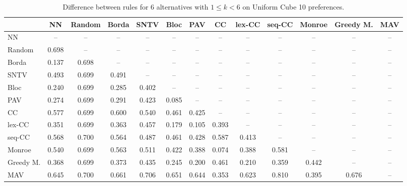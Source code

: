 
\begin{table*}[htbp]
\centering
\begin{tabular}{lcccccccccccc}
\toprule
 & NN & Random & Borda & SNTV & Bloc & PAV & CC & lex-CC & seq-CC & Monroe & Greedy M. & MAV \\
\midrule
NN & -- & -- & -- & -- & -- & -- & -- & -- & -- & -- & -- & -- \\
Random & \cellcolor{blue!69} 0.698 & -- & -- & -- & -- & -- & -- & -- & -- & -- & -- & -- \\
Borda & \cellcolor{blue!13} 0.137 & \cellcolor{blue!69} 0.698 & -- & -- & -- & -- & -- & -- & -- & -- & -- & -- \\
SNTV & \cellcolor{blue!49} 0.493 & \cellcolor{blue!69} 0.699 & \cellcolor{blue!49} 0.491 & -- & -- & -- & -- & -- & -- & -- & -- & -- \\
Bloc & \cellcolor{blue!24} 0.240 & \cellcolor{blue!69} 0.699 & \cellcolor{blue!28} 0.285 & \cellcolor{blue!40} 0.402 & -- & -- & -- & -- & -- & -- & -- & -- \\
PAV & \cellcolor{blue!27} 0.274 & \cellcolor{blue!69} 0.699 & \cellcolor{blue!29} 0.291 & \cellcolor{blue!42} 0.423 & \cellcolor{blue!8} 0.085 & -- & -- & -- & -- & -- & -- & -- \\
CC & \cellcolor{blue!57} 0.577 & \cellcolor{blue!69} 0.699 & \cellcolor{blue!60} 0.600 & \cellcolor{blue!54} 0.540 & \cellcolor{blue!46} 0.461 & \cellcolor{blue!42} 0.425 & -- & -- & -- & -- & -- & -- \\
lex-CC & \cellcolor{blue!35} 0.351 & \cellcolor{blue!69} 0.699 & \cellcolor{blue!36} 0.363 & \cellcolor{blue!45} 0.457 & \cellcolor{blue!17} 0.179 & \cellcolor{blue!10} 0.105 & \cellcolor{blue!39} 0.393 & -- & -- & -- & -- & -- \\
seq-CC & \cellcolor{blue!56} 0.568 & \cellcolor{blue!70} 0.700 & \cellcolor{blue!56} 0.564 & \cellcolor{blue!48} 0.487 & \cellcolor{blue!46} 0.461 & \cellcolor{blue!42} 0.428 & \cellcolor{blue!58} 0.587 & \cellcolor{blue!41} 0.413 & -- & -- & -- & -- \\
Monroe & \cellcolor{blue!54} 0.540 & \cellcolor{blue!69} 0.699 & \cellcolor{blue!56} 0.563 & \cellcolor{blue!51} 0.511 & \cellcolor{blue!42} 0.422 & \cellcolor{blue!38} 0.388 & \cellcolor{blue!7} 0.074 & \cellcolor{blue!38} 0.388 & \cellcolor{blue!58} 0.581 & -- & -- & -- \\
Greedy M. & \cellcolor{blue!36} 0.368 & \cellcolor{blue!69} 0.699 & \cellcolor{blue!37} 0.373 & \cellcolor{blue!43} 0.435 & \cellcolor{blue!24} 0.245 & \cellcolor{blue!20} 0.200 & \cellcolor{blue!46} 0.461 & \cellcolor{blue!21} 0.210 & \cellcolor{blue!35} 0.359 & \cellcolor{blue!44} 0.442 & -- & -- \\
MAV & \cellcolor{blue!64} 0.645 & \cellcolor{blue!70} 0.700 & \cellcolor{blue!66} 0.661 & \cellcolor{blue!70} 0.706 & \cellcolor{blue!65} 0.651 & \cellcolor{blue!64} 0.644 & \cellcolor{blue!35} 0.353 & \cellcolor{blue!62} 0.623 & \cellcolor{blue!81} 0.810 & \cellcolor{blue!39} 0.395 & \cellcolor{blue!67} 0.676 & -- \\
\bottomrule
\end{tabular}

\caption{Difference between rules for 6 alternatives with $1 \leq k < 6$ on Uniform Cube 10 preferences.}
\label{tab:rule_distance_heatmap-m=[6]-pref_dist=euclidean__args__dimensions=10_-_space=uniform_cube}
\end{table*}
    